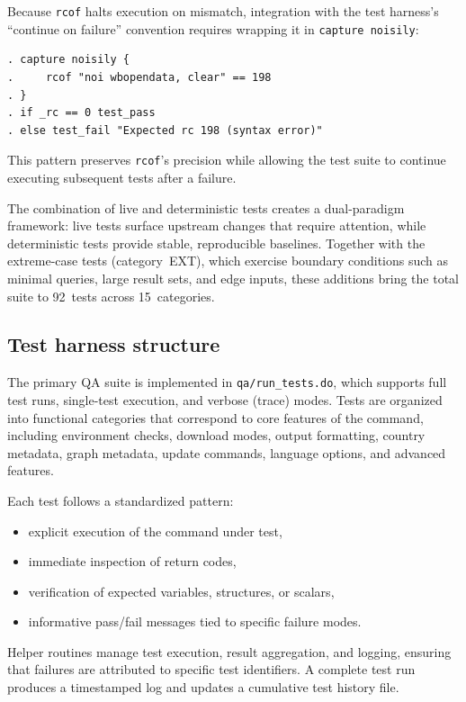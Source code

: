 \documentclass[bib]{statapress}
\begin{document}
Because \texttt{rcof} halts execution on mismatch, integration with the
test harness's ``continue on failure'' convention requires wrapping it in
\texttt{capture noisily}:

\begin{stlog}
\begin{verbatim}
. capture noisily {
.     rcof "noi wbopendata, clear" == 198
. }
. if _rc == 0 test_pass
. else test_fail "Expected rc 198 (syntax error)"
\end{verbatim}
\nullskip
\end{stlog}

\noindent This pattern preserves \texttt{rcof}'s precision while allowing the
test suite to continue executing subsequent tests after a failure.

The combination of live and deterministic tests creates a dual-paradigm
framework: live tests surface upstream changes that require attention, while
deterministic tests provide stable, reproducible baselines.  Together with the
extreme-case tests (category~EXT), which exercise boundary conditions such as
minimal queries, large result sets, and edge inputs, these additions bring the
total suite to 92~tests across 15~categories.

\subsection{Test harness structure}

The primary QA suite is implemented in \texttt{qa/run\_tests.do}, which
supports full test runs, single-test execution, and verbose (trace) modes.
Tests are organized into functional categories that correspond to core
features of the command, including environment checks, download modes, output
formatting, country metadata, graph metadata, update commands, language
options, and advanced features.

Each test follows a standardized pattern:
\begin{itemize}
  \item explicit execution of the command under test,
  \item immediate inspection of return codes,
  \item verification of expected variables, structures, or scalars,
  \item informative pass/fail messages tied to specific failure modes.
\end{itemize}

Helper routines manage test execution, result aggregation, and logging, ensuring
that failures are attributed to specific test identifiers. A complete test run
produces a timestamped log and updates a cumulative test history file.
\end{document}
